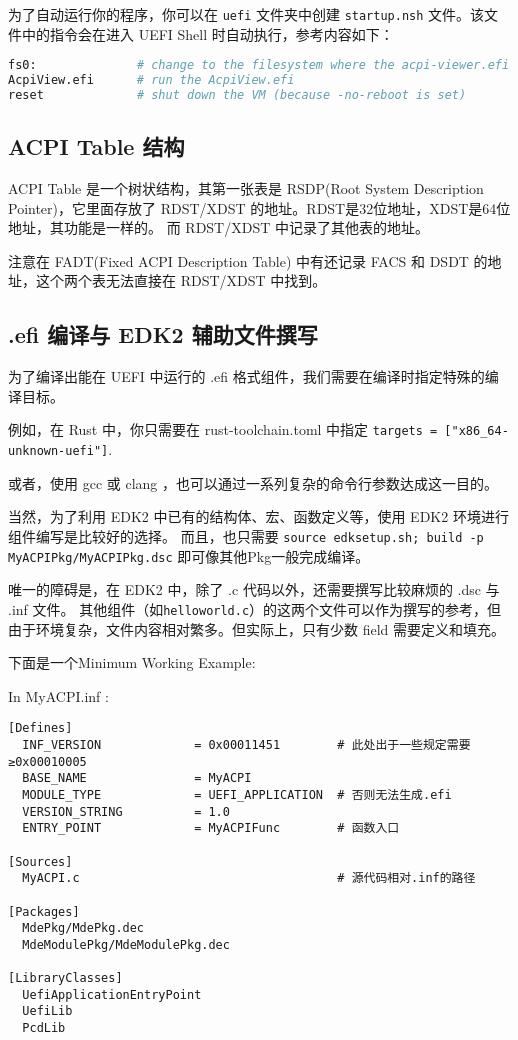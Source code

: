 为了自动运行你的程序，你可以在 \texttt{uefi} 文件夹中创建 \texttt{startup.nsh} 文件。该文件中的指令会在进入 UEFI Shell 时自动执行，参考内容如下：

\begin{lstlisting}[language=bash]
fs0:              # change to the filesystem where the acpi-viewer.efi is located
AcpiView.efi      # run the AcpiView.efi
reset             # shut down the VM (because -no-reboot is set)
\end{lstlisting}

\subsection{ACPI Table 结构}

ACPI Table 是一个树状结构，其第一张表是 RSDP(Root System Description Pointer)，它里面存放了 RDST/XDST 的地址。RDST是32位地址，XDST是64位地址，其功能是一样的。
而 RDST/XDST 中记录了其他表的地址。

注意在 FADT(Fixed ACPI Description Table) 中有还记录 FACS 和 DSDT 的地址，这个两个表无法直接在 RDST/XDST 中找到。

\subsection{.efi 编译与 EDK2 辅助文件撰写}
为了编译出能在 UEFI 中运行的 .efi 格式组件，我们需要在编译时指定特殊的编译目标。

例如，在 Rust 中，你只需要在 rust-toolchain.toml 中指定
\texttt{targets = ["x86\_64-unknown-uefi"]}.

或者，使用 gcc 或 clang ，也可以通过一系列复杂的命令行参数达成这一目的。

当然，为了利用 EDK2 中已有的结构体、宏、函数定义等，使用 EDK2 环境进行组件编写是比较好的选择。
而且，也只需要 \texttt{source edksetup.sh; build -p MyACPIPkg/MyACPIPkg.dsc} 即可像其他Pkg一般完成编译。

唯一的障碍是，在 EDK2 中，除了 .c 代码以外，还需要撰写比较麻烦的 .dsc 与 .inf 文件。
其他组件（如\texttt{helloworld.c}）的这两个文件可以作为撰写的参考，但由于环境复杂，文件内容相对繁多。但实际上，只有少数 field 需要定义和填充。

下面是一个Minimum Working Example: 

In MyACPI.inf :

\begin{lstlisting}
[Defines]
  INF_VERSION             = 0x00011451        # 此处出于一些规定需要≥0x00010005
  BASE_NAME               = MyACPI
  MODULE_TYPE             = UEFI_APPLICATION  # 否则无法生成.efi
  VERSION_STRING          = 1.0
  ENTRY_POINT             = MyACPIFunc        # 函数入口

[Sources]
  MyACPI.c                                    # 源代码相对.inf的路径

[Packages]
  MdePkg/MdePkg.dec
  MdeModulePkg/MdeModulePkg.dec

[LibraryClasses]
  UefiApplicationEntryPoint
  UefiLib
  PcdLib
\end{lstlisting}

